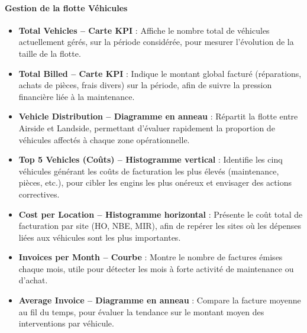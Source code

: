 \documentclass[a4paper,11pt]{report}
\begin{document}
\vspace{1em}

\paragraph{\textbf{Gestion de la flotte Véhicules}}
\begin{itemize}[leftmargin=*, topsep=0pt, itemsep=0.5em]
  \item \textbf{Total Vehicles – Carte KPI} :  
    Affiche le nombre total de véhicules actuellement gérés, sur la période considérée, pour mesurer l’évolution de la taille de la flotte.

  \item \textbf{Total Billed – Carte KPI} :  
    Indique le montant global facturé (réparations, achats de pièces, frais divers) sur la période, afin de suivre la pression financière liée à la maintenance.

  \item \textbf{Vehicle Distribution – Diagramme en anneau} :  
    Répartit la flotte entre Airside et Landside, permettant d’évaluer rapidement la proportion de véhicules affectés à chaque zone opérationnelle.

  \item \textbf{Top 5 Vehicles (Coûts) – Histogramme vertical} :  
    Identifie les cinq véhicules générant les coûts de facturation les plus élevés (maintenance, pièces, etc.), pour cibler les engins les plus onéreux et envisager des actions correctives.

  \item \textbf{Cost per Location – Histogramme horizontal} :  
    Présente le coût total de facturation par site (HO, NBE, MIR), afin de repérer les sites où les dépenses liées aux véhicules sont les plus importantes.

  \item \textbf{Invoices per Month – Courbe} :  
    Montre le nombre de factures émises chaque mois, utile pour détecter les mois à forte activité de maintenance ou d’achat.

  \item \textbf{Average Invoice – Diagramme en anneau} :  
    Compare la facture moyenne au fil du temps, pour évaluer la tendance sur le montant moyen des interventions par véhicule.
\end{itemize}
\end{document}
